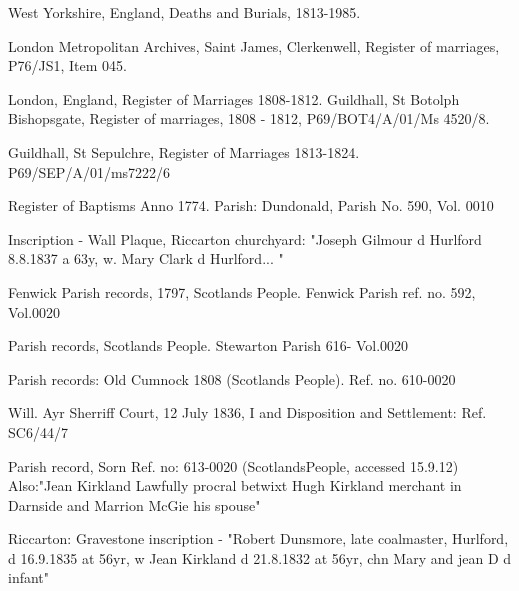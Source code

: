 \begin{thebibliography}{99}
	West Yorkshire, England, Deaths and Burials, 1813-1985. 
	
	London Metropolitan Archives, Saint James, Clerkenwell, Register of marriages, P76/JS1, Item 045. 
	
	 London, England, Register of Marriages 1808-1812.
	 Guildhall, St Botolph Bishopsgate, Register of marriages, 1808 - 1812, P69/BOT4/A/01/Ms 4520/8.
	 
	 Guildhall, St Sepulchre, Register of Marriages 1813-1824. P69/SEP/A/01/ms7222/6
	 
	 Register of Baptisms Anno 1774. Parish: Dundonald, Parish No. 590, Vol. 0010
	 
	Inscription - Wall Plaque, Riccarton churchyard: "Joseph Gilmour d Hurlford 8.8.1837 a 63y, w. Mary Clark d		Hurlford... " 
	
	Fenwick Parish records, 1797, Scotlands People. Fenwick Parish ref. no. 592, Vol.0020
	
	Parish records, Scotlands People. Stewarton Parish 616- Vol.0020
	
	Parish records: Old Cumnock 1808 (Scotlands People). Ref. no. 610-0020
	
	 Will. Ayr Sherriff Court, 12 July 1836, I and Disposition and Settlement: Ref. SC6/44/7
	 
	Parish record, Sorn Ref. no: 613-0020 (ScotlandsPeople, accessed 15.9.12)
	Also:"Jean Kirkland Lawfully procral betwixt Hugh Kirkland merchant in Darnside and Marrion McGie his 			spouse"
	
	Riccarton: Gravestone inscription - "Robert Dunsmore, late coalmaster, Hurlford, d 16.9.1835 at 56yr,
	w Jean Kirkland d 21.8.1832 at 56yr, chn Mary and jean D d infant"
	


	
\bibitem{


















	





}
\end{thebibliography}

